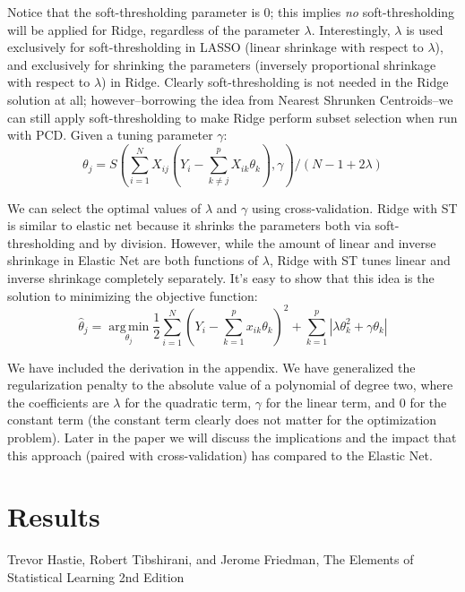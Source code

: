 \documentclass[11pt]{article}
\newcommand{\thh}{\hat{\theta}}
\DeclareMathOperator*{\argmin}{arg\,min}
\begin{document}
Notice that the soft-thresholding parameter is 0; this implies \textit{no} soft-thresholding will be applied for Ridge, regardless of the parameter $\lambda$.  Interestingly, $\lambda$ is used exclusively for soft-thresholding in LASSO (linear shrinkage with respect to $\lambda$), and exclusively for shrinking the parameters (inversely proportional shrinkage with respect to $\lambda$) in Ridge.  Clearly soft-thresholding is not needed in the Ridge solution at all; however--borrowing the idea from Nearest Shrunken Centroids--we can still apply soft-thresholding to make Ridge perform subset selection when run with PCD.  Given a tuning parameter $\gamma$:
	$$\theta_j = S\left(\sum\limits_{i=1}^N X_{ij}(Y_i - \sum\limits_{k \ne j}^p X_{ik}\theta_k), \gamma\right)/(N-1+2\lambda)$$

We can select the optimal values of $\lambda$ and $\gamma$ using cross-validation.  Ridge with ST is similar to elastic net because it shrinks the parameters both via soft-thresholding and by division.  However, while the amount of linear and inverse shrinkage in Elastic Net are both functions of $\lambda$, Ridge with ST tunes linear and inverse shrinkage completely separately.  It's easy to show that this idea is the solution to minimizing the objective function:
	$$\thh_j = \argmin\limits_{\theta_j} \frac{1}{2} \sum\limits_{i=1}^N \left(Y_i - \sum\limits_{k=1}^px_{ik}\theta_k \right)^2 +\sum\limits_{k=1}^p \left|\lambda\theta_k^2 + \gamma\theta_k\right|$$

We have included the derivation in the appendix.  We have generalized the regularization penalty to the absolute value of a polynomial of degree two, where the coefficients are $\lambda$ for the quadratic term, $\gamma$ for the linear term, and 0 for the constant term (the constant term clearly does not matter for the optimization problem).  Later in the paper we will discuss the implications and the impact that this approach (paired with cross-validation) has compared to the Elastic Net.  


\section{Results}

\begin{thebibliography}{9}
Trevor Hastie, Robert Tibshirani, and Jerome Friedman,
The Elements of Statistical Learning 2nd Edition
\end{thebibliography}
\end{document}
